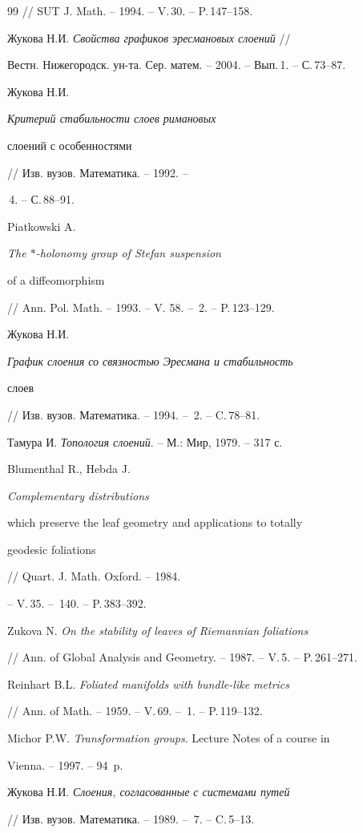 \begin{thebibliography}{99}
// SUT J. Math. -- 1994. -- V.\,30. -- P.\,147--158.




Жукова Н.И. {\it Свойства графиков эресмановых слоений} //


Вестн. Нижегородск. ун-та. Сер. матем. -- 2004. -- Вып.\,1. -- С.\,73--87.




Жукова Н.И. {\it Критерий стабильности слоев римановых


слоений с особенностями} // Изв. вузов. Математика. -- 1992. --


\No\,4. -- С.\,88--91.




Piatkowski A. {\it The $*$-holonomy group of Stefan suspension 


of a diffeomorphism}


// Ann. Pol. Math. -- 1993. -- V. 58. -- \No\,2. -- P.\,123--129.




Жукова Н.И. {\it График слоения со связностью Эресмана и стабильность


слоев} // Изв. вузов. Математика. -- 1994. -- \No\,2. -- C.\,78--81.




Тамура И. {\em Топология слоений}. -- М.: Мир, 1979. -- 317 с.


 Blumenthal R., Hebda J. {\it Complementary distributions


which preserve the leaf geometry and applications to totally


geodesic foliations} // Quart. J. Math. Oxford. -- 1984.


-- V.\,35. -- \No\,140. -- P.\,383--392.




Zukova N. {\it On the stability of leaves of Riemannian foliations}


// Ann. of Global Analysis and Geometry. -- 1987. -- V.\,5. -- P.\,261--271.


 Reinhart B.L. {\it Foliated manifolds with bundle-like metrics}


// Ann. of Math. -- 1959. -- V.\,69. -- \No\,1. -- P.\,119--132.


  Michor P.W. {\em Transformation groups}. Lecture Notes of a course in


Vienna. -- 1997. -- 94~p.


 Жукова Н.И. {\it Слоения, согласованные с системами путей}


// Изв. вузов. Математика. -- 1989. -- \No\,7. -- C.\,5--13.





\end{thebibliography}





\vskip 2cm












\label{end}





